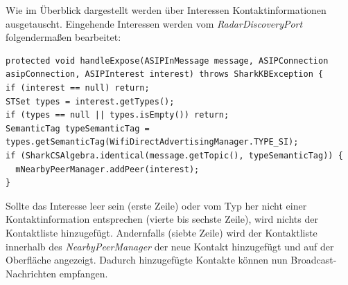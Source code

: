 Wie im Überblick dargestellt werden über Interessen Kontaktinformationen ausgetauscht. Eingehende Interessen werden vom \textit{RadarDiscoveryPort} folgendermaßen bearbeitet:\newline
 \lstset{language=Java, caption=Verwertung von  Kontakt-Interessen (Auszug), label=DescriptiveLabel, numbers=left, numbersep=1em, breaklines=true, basicstyle=\small}
\begin{lstlisting}
protected void handleExpose(ASIPInMessage message, ASIPConnection asipConnection, ASIPInterest interest) throws SharkKBException {
if (interest == null) return;
STSet types = interest.getTypes();
if (types == null || types.isEmpty()) return;
SemanticTag typeSemanticTag = types.getSemanticTag(WifiDirectAdvertisingManager.TYPE_SI);
if (SharkCSAlgebra.identical(message.getTopic(), typeSemanticTag)) {
  mNearbyPeerManager.addPeer(interest);
}
\end{lstlisting}
Sollte das Interesse leer sein (erste Zeile) oder vom Typ her nicht einer Kontaktinformation entsprechen (vierte bis sechste Zeile), wird nichts der Kontaktliste hinzugefügt. Andernfalls (siebte Zeile) wird der Kontaktliste innerhalb des \textit{NearbyPeerManager} der neue Kontakt hinzugefügt und auf der Oberfläche angezeigt. Dadurch hinzugefügte Kontakte können nun Broadcast-Nachrichten empfangen.

